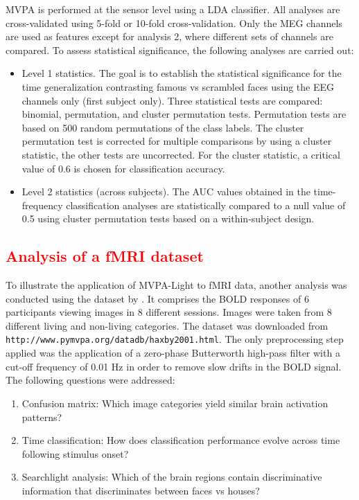 \documentclass[utf8]{frontiersSCNS} %
\newcommand{\ttt}[1]{\texttt{#1}}
\newcommand{\red}[1]{\textcolor{red}{#1}}
\begin{document}
MVPA is performed at the sensor level using a LDA classifier. All analyses are cross-validated using 5-fold or 10-fold cross-validation. Only the MEG channels are used as features except for analysis 2, where different sets of channels are compared. To assess statistical significance, the following analyses are carried out:

\begin{itemize}
    \item Level 1 statistics. The goal is to establish the statistical significance for the time generalization contrasting famous vs scrambled faces using the EEG channels only (first subject only). Three statistical tests are compared: binomial, permutation, and cluster permutation tests. Permutation tests are based on 500 random permutations of the class labels. The cluster permutation test is corrected for multiple comparisons by using a cluster statistic, the other tests are uncorrected. For the cluster statistic, a critical value of 0.6 is chosen for  classification accuracy.
    \item Level 2 statistics (across subjects). The AUC values obtained in the time-frequency classification analyses are statistically compared to a null value of 0.5 using cluster permutation tests based on a within-subject design.
    
\end{itemize}

\red{\subsection{Analysis of a fMRI dataset}}
To illustrate the application of MVPA-Light to fMRI data, another analysis was conducted using the dataset by \cite{Haxby2001}. It comprises the BOLD responses of 6 participants viewing images in 8 different sessions. Images were taken from 8 different living and non-living categories. The dataset was downloaded from \ttt{http://www.pymvpa.org/datadb/haxby2001.html}. The only preprocessing step applied was the application of a zero-phase Butterworth high-pass filter with a cut-off frequency of 0.01 Hz in order to remove slow drifts in the BOLD signal. The following questions were addressed:

\begin{enumerate}
    \item Confusion matrix: Which image categories yield similar brain activation patterns?
    \item Time classification: How does classification performance evolve across time following stimulus onset?
    \item Searchlight analysis: Which of the brain regions contain discriminative information that discriminates between faces vs houses?
\end{enumerate}
\end{document}
